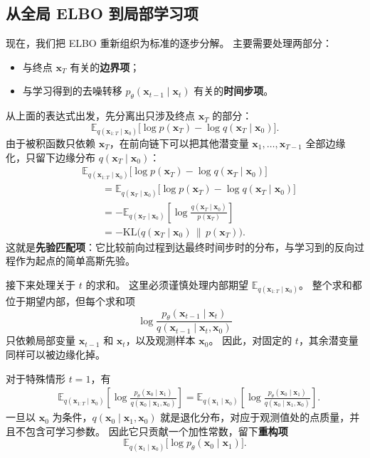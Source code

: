 \subsection{从全局 ELBO 到局部学习项}

现在，我们把 ELBO 重新组织为标准的逐步分解。
主要需要处理两部分：
\begin{itemize}
    \item 与终点 $\mathbf{x}_T$ 有关的\textbf{边界项}；
    \item 与学习得到的去噪转移
    $p_\theta(\mathbf{x}_{t-1}\mid \mathbf{x}_t)$ 有关的\textbf{时间步项}。
\end{itemize}

从上面的表达式出发，先分离出只涉及终点 $\mathbf{x}_T$ 的部分：
\[
\mathbb{E}_{q(\mathbf{x}_{1:T}\mid \mathbf{x}_0)}
\!\big[
\log p(\mathbf{x}_T)-\log q(\mathbf{x}_T\mid \mathbf{x}_0)
\big].
\]
由于被积函数只依赖 $\mathbf{x}_T$，在前向链下可以把其他潜变量
$\mathbf{x}_1,\dots,\mathbf{x}_{T-1}$ 全部边缘化，只留下边缘分布
$q(\mathbf{x}_T\mid \mathbf{x}_0)$：
\[
\begin{aligned}
&\mathbb{E}_{q(\mathbf{x}_{1:T}\mid \mathbf{x}_0)}
\!\big[
\log p(\mathbf{x}_T)-\log q(\mathbf{x}_T\mid \mathbf{x}_0)
\big] \\[4pt]
&\qquad=
\mathbb{E}_{q(\mathbf{x}_T\mid \mathbf{x}_0)}
\!\big[
\log p(\mathbf{x}_T)-\log q(\mathbf{x}_T\mid \mathbf{x}_0)
\big] \\[4pt]
&\qquad=
-\mathbb{E}_{q(\mathbf{x}_T\mid \mathbf{x}_0)}
\!\left[
\log \frac{q(\mathbf{x}_T\mid \mathbf{x}_0)}{p(\mathbf{x}_T)}
\right] \\[4pt]
&\qquad=
-\mathrm{KL}\!\bigl(
q(\mathbf{x}_T\mid \mathbf{x}_0)\,\|\,p(\mathbf{x}_T)
\bigr).
\end{aligned}
\]
这就是\textbf{先验匹配项}：它比较前向过程到达最终时间步时的分布，与学习到的反向过程作为起点的简单高斯先验。

接下来处理关于 $t$ 的求和。
这里必须谨慎处理内部期望
$\mathbb{E}_{q(\mathbf{x}_{1:T}\mid \mathbf{x}_0)}$。
整个求和都位于期望内部，但每个求和项
\[
\log
\frac{
p_\theta(\mathbf{x}_{t-1}\mid \mathbf{x}_t)
}{
q(\mathbf{x}_{t-1}\mid \mathbf{x}_t,\mathbf{x}_0)
}
\]
只依赖局部变量 $\mathbf{x}_{t-1}$ 和 $\mathbf{x}_t$，以及观测样本 $\mathbf{x}_0$。
因此，对固定的 $t$，其余潜变量同样可以被边缘化掉。

对于特殊情形 $t=1$，有
\[
\begin{aligned}
&\mathbb{E}_{q(\mathbf{x}_{1:T}\mid \mathbf{x}_0)}
\!\left[
\log
\frac{
p_\theta(\mathbf{x}_0\mid \mathbf{x}_1)
}{
q(\mathbf{x}_0\mid \mathbf{x}_1,\mathbf{x}_0)
}
\right] =
\mathbb{E}_{q(\mathbf{x}_1\mid \mathbf{x}_0)}
\!\left[
\log
\frac{
p_\theta(\mathbf{x}_0\mid \mathbf{x}_1)
}{
q(\mathbf{x}_0\mid \mathbf{x}_1,\mathbf{x}_0)
}
\right].
\end{aligned}
\]
一旦以 $\mathbf{x}_0$ 为条件，$q(\mathbf{x}_0\mid \mathbf{x}_1,\mathbf{x}_0)$ 就是退化分布，对应于观测值处的点质量，并且不包含可学习参数。
因此它只贡献一个加性常数，留下\textbf{重构项}
\[
\mathbb{E}_{q(\mathbf{x}_1\mid \mathbf{x}_0)}
\big[
\log p_\theta(\mathbf{x}_0\mid \mathbf{x}_1)
\big].
\]

